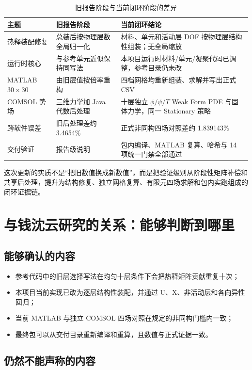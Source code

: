 \documentclass[UTF8,fontset=windows,12pt,a4paper]{ctexart}
\begin{document}
\begin{table}[H]
\centering
\caption{旧报告阶段与当前闭环阶段的差异}
\label{tab:report-update}
\small
\begin{tabularx}{\textwidth}{p{}p{}Y}
\toprule
主题 & 旧报告阶段 & 当前闭环结论 \\
\midrule
热释装配修复 & 总装后按物理层数全局归一化 & 材料、单元和活动层 DOF 按物理层结构性组装；无全局缩放 \\
运行时核心 & 与参考单元近似保持同写法 & 本项目运行时材料/单元/凝聚代码已调整，参考目录仍未改 \\
MATLAB $30\times30$ & 由旧层值按倍率重构 & 四档网格均重新组装、求解并写出正式 CSV \\
COMSOL 势场 & 三维力学加 Java 代数后处理 & 十层独立 $\phi/\psi/T$ Weak Form PDE 与固体力学，同一 Stationary 策略 \\
跨软件误差 & 旧后处理差约 3.4654\% & 正式非同构四场对照差约 1.839143\% \\
交付验证 & 报告级说明 & 包内编译、MATLAB 复算、哈希与 14 项统一门禁全部通过 \\
\bottomrule
\end{tabularx}
\end{table}

这次更新的实质不是“把旧数值换成新数值”，而是把验证级别从阶段性矩阵补偿和共享后处理，提升为结构修复、独立网格复算、有限元四场求解和包内实跑组成的闭环证据链。

\section{与钱沈云研究的关系：能够判断到哪里}

\subsection{能够确认的内容}

\begin{itemize}[leftmargin=2.4em]
  \item 参考代码中的旧层选择写法在均匀十层条件下会把热释矩阵贡献重复十次；
  \item 本项目当前实现已改为逐层结构性装配，并通过 U、X、非活动层和各向异性回归；
  \item 当前 MATLAB 与独立 COMSOL 四场对照在规定的非同构门槛内一致；
  \item 最终包可以从交付目录重新编译和重算，且数值与正式证据一致。
\end{itemize}

\subsection{仍然不能声称的内容}
\end{document}
